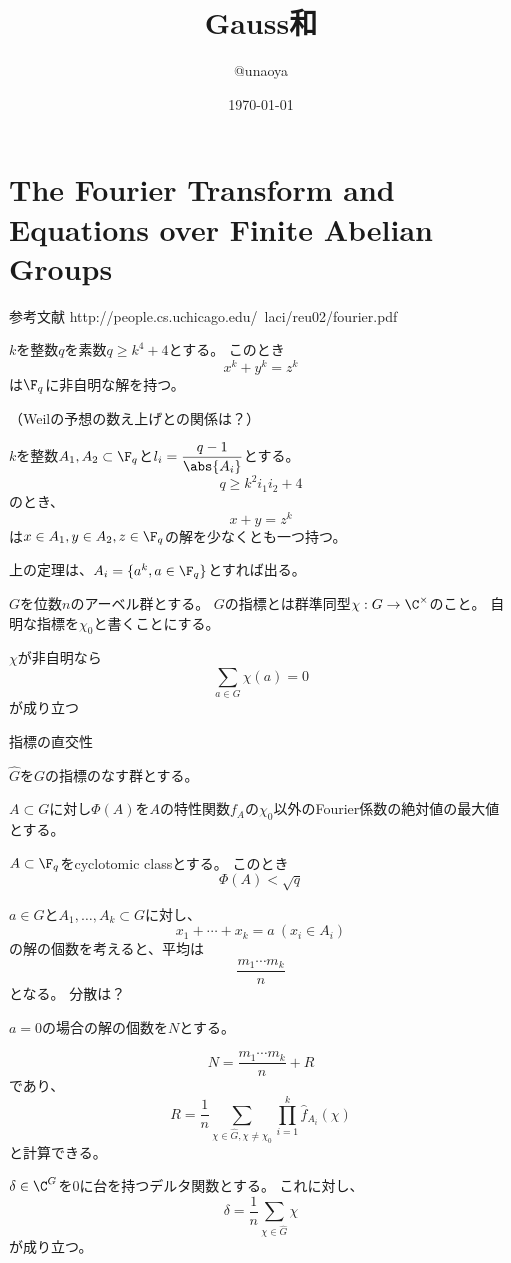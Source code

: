 \documentclass{jsarticle}
\title{Gauss和}
\author{@unaoya}
\date{\today}
\begin{document}
\section{The Fourier Transform and Equations over Finite Abelian Groups}
参考文献
http://people.cs.uchicago.edu/~laci/reu02/fourier.pdf

\begin{thm}
$k$を整数$q$を素数$q\geq k^4+4$とする。
このとき
\[
x^k+y^k=z^k
\]
は$\F_q$に非自明な解を持つ。
\end{thm}
（Weilの予想の数え上げとの関係は？）

\begin{thm}
$k$を整数$A_1, A_2\subset\F_q$と$l_i=\dfrac{q-1}{\abs{A_i}}$とする。
\[
q\geq k^2i_1i_2+4
\]
のとき、
\[
x+y=z^k
\]
は$x \in A_1, y\in A_2, z\in \F_q$の解を少なくとも一つ持つ。
\end{thm}
上の定理は、$A_i=\{a^k,a\in\F_q\}$とすれば出る。

$G$を位数$n$のアーベル群とする。
$G$の指標とは群準同型$\chi: G\to \C^\times$のこと。
自明な指標を$\chi_0$と書くことにする。
\begin{prop}
$\chi$が非自明なら
\[
\sum_{a\in G}\chi(a)=0
\]
が成り立つ
\end{prop}

\begin{cor}
指標の直交性
\end{cor}

$\hat{G}$を$G$の指標のなす群とする。

$A\subset G$に対し$\Phi(A)$を$A$の特性関数$f_A$の$\chi_0$以外のFourier係数の絶対値の最大値とする。
\begin{thm}
$A\subset \F_q$をcyclotomic classとする。
このとき
\[
\Phi(A) < \sqrt{q}
\]
\end{thm}

$a\in G$と$A_1,\ldots,A_k\subset G$に対し、
\[
x_1+\cdots+x_k=a~(x_i\in A_i)
\]
の解の個数を考えると、平均は
\[
\frac{m_1\cdots m_k}{n}
\]
となる。
分散は？

$a=0$の場合の解の個数を$N$とする。

\begin{thm}[Theorem 3.1]
\[
N=\frac{m_1\cdots m_k}{n}+R
\]
であり、
\[
R=\frac{1}{n}\sum_{\chi\in\hat{G}, \chi\neq\chi_0}\prod_{i=1}^k\hat{f}_{A_i}(\chi)
\]
と計算できる。
\end{thm}

$\delta\in\C^G$を$0$に台を持つデルタ関数とする。
これに対し、
\[
\delta=\frac{1}{n}\sum_{\chi\in\hat{G}}\chi
\]
が成り立つ。
\end{document}
